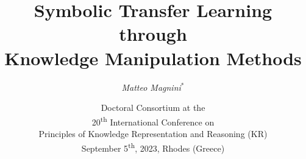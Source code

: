 \documentclass[presentation]{beamer}\mode<presentation>{\usetheme{blackAMSBolognaFC}}
\title[Symbolic Transfer Learning]{
    \textbf{Symbolic Transfer Learning through}
    \\
    \textbf{Knowledge Manipulation Methods}
}
\author[Magnini]{
	\emph{Matteo Magnini}$^{*}$ %
}
\institute[UniBo]{
    $^{*}$Dipartimento di Informatica -- Scienza e Ingegneria (DISI)
    \\
    \textsc{Alma Mater Studiorum} -- Università di Bologna
    \\
    \texttt{
        \emph{matteo.magnini}@unibo.it %
    }
}
\date[DC KR 2023]{
	Doctoral Consortium at the
    \\
    20\textsuperscript{th} International Conference on
	\\
	Principles of Knowledge Representation and Reasoning (KR)
	\\
	September 5\textsuperscript{th}, 2023, Rhodes (Greece)
}
\begin{document}

\frame{\titlepage}
\end{document}
